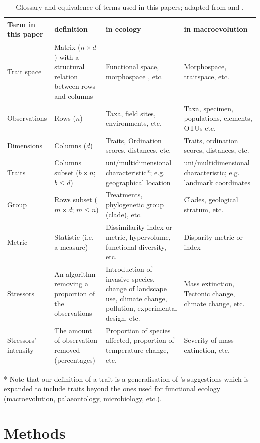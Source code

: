 \documentclass[12pt,letterpaper]{article}
\begin{document}
\begin{table}[ht]
\caption{Glossary and equivalence of terms used in this papers; adapted from \cite{guillerme2018disprity} and \cite{mammola2021concepts}.}
\centering
\begin{tabular}{p{2.5cm}p{4cm}p{5cm}p{5cm}}
Term in this paper & definition & in ecology & in macroevolution \\
\hline
Trait space & Matrix ($n \times d$) with a structural relation between rows and columns & Functional space, morphospace , etc. & Morphospace, traitspace, etc.  \\
\hline
Observations & Rows ($n$) & Taxa, field sites, environments, etc. & Taxa, specimen, populations, elements, OTUs etc. \\
\hline
Dimensions & Columns ($d$) & Traits, Ordination scores, distances, etc. & Traits, ordination scores, distances, etc. \\
\hline
Traits & Columns subset ($b \times n$; $b \leq d$) & uni/multidimensional characteristic*; e.g. geographical location & uni/multidimensional characteristic; e.g. landmark coordinates \\
\hline
Group & Rows subset ($m \times d$; $m \leq n$) & Treatments, phylogenetic group (clade), etc. & Clades, geological stratum, etc. \\
\hline
Metric & Statistic (i.e. a measure) & Dissimilarity index or metric, hypervolume, functional diversity, etc. & Disparity metric or index \\
\hline
Stressors & An algorithm removing a proportion of the observations & Introduction of invasive species, change of landscape use, climate change, pollution, experimental design, etc. & Mass extinction, Tectonic change, climate change, etc. \\
\hline
Stressors' intensity & The amount of observation removed (percentages) & Proportion of species affected, proportion of temperature change, etc. & Severity of mass extinction,  etc. \\
\hline
\end{tabular}
* Note that our definition of a trait is a generalisation of \cite{violle2007let,mcgill2006rebuilding,dawson2021traits}'s suggestions which is expanded to include traits beyond the ones used for functional ecology (macroevolution, palaeontology, microbiology, etc.).
\end{table}


\section{Methods}
\end{document}
